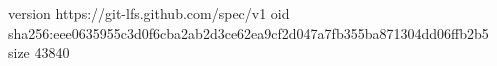 version https://git-lfs.github.com/spec/v1
oid sha256:eee0635955c3d0f6cba2ab2d3ce62ea9cf2d047a7fb355ba871304dd06ffb2b5
size 43840
